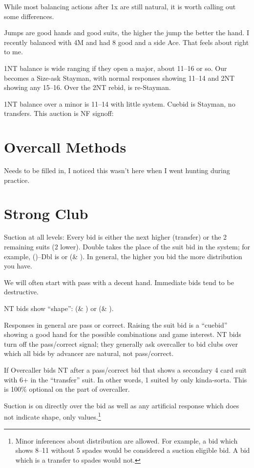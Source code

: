 \documentclass[tom-ari]{subfile}
\begin{document}
	While most balancing actions after 1x are still natural, it is worth calling out some differences.
	
	Jumps are good hands and good suits, the higher the jump the better the hand. I recently balanced with 4M and had 8 good and a side Ace. That feels about right to me.
	
	1NT balance is wide ranging if they open a major, about 11--16 or so. Our  becomes a Size-ask Stayman, with normal responses showing 11--14 and 2NT showing any 15--16. Over the 2NT rebid,  is re-Stayman.
	
	1NT balance over a minor is 11--14 with little system. Cuebid is Stayman, no transfers. This auction is NF signoff:
	
	
	\section{Overcall Methods}
	
		Needs to be filled in, I noticed this wasn't here when I went hunting during practice.
	
	\section{Strong Club}
	
	Suction at all levels: Every bid is either the next higher (transfer) or the 2 remaining suits (2 lower). Double takes the place of the suit bid in the system; for example, ()--Dbl is \ddd or (\hhh \& \sss). In general, the higher you bid the more distribution you have. 
	
	We will often start with pass with a decent hand. Immediate bids tend to be destructive.
	
	NT bids show ``shape'': (\ddd \& \sss) or (\ccc \& \hhh).
	
	Responses in general are pass or correct. Raising the suit bid is a ``cuebid'' showing a good hand for the possible combinations and game interest. NT bids turn off the pass/correct signal; they generally ask overcaller to bid clubs over which all bids by advancer are natural, not pass/correct.
	
	If Overcaller bids NT after a pass/correct bid that shows a secondary 4 card suit with 6+ in the ``transfer'' suit. In other words, 1 suited by only kinda-sorta. This is 100\% optional on the part of overcaller.
	
	Suction is on directly over the  bid as well as any artificial response which does not indicate shape, only values.\footnote{Minor inferences about distribution are allowed. For example, a  bid which shows 8--11 without 5 spades would be considered a suction eligible bid. A  bid which is a transfer to spades would not.}
	
\end{document}
